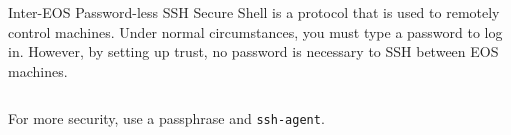 \begin{block}{Inter-EOS Password-less SSH}
  Secure Shell is a protocol that is used to remotely control machines. Under normal circumstances, you must type a password to log in. However, by setting up trust, no password is necessary to SSH between EOS machines.
  \begin{indented}
    {\scriptsize \inputminted[tabsize=2,frame=single]{bash}{scripts/ssh.bash}}
  \end{indented}
  For more security, use a passphrase and \texttt{ssh-agent}.
\end{block}
